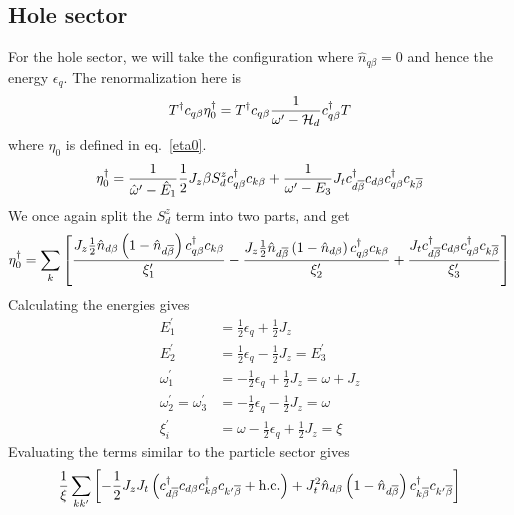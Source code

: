 \documentclass[12pt,twoside]{report}
\numberwithin{equation}{section}
\begin{document}
\subsection{Hole sector}
For the hole sector, we will take the configuration where \(\hat n_{q\beta} = 0\) and hence the energy \(\epsilon_q\). The renormalization here is
\begin{equation}\begin{aligned}
	T^\dagger c_{q\beta}\eta^\dagger_0 = T^\dagger c_{q\beta}\frac{1}{\omega^\prime - \mathcal{H}_d}c^\dagger_{q\beta} T
\end{aligned}\end{equation}
where \(\eta_0\) is defined in eq.~\ref{eta0}.
\begin{equation}\begin{aligned}
	\label{holeomega}
	\eta_0^\dagger = \frac{1}{\hat \omega^\prime - \hat E_1}\frac{1}{2}J_z \beta S_d^z c^\dagger_{q\beta}c_{k\beta} + \frac{1}{\omega^\prime - E_3}J_tc^\dagger_{d\overline\beta}c_{d\beta}c^\dagger_{q\beta}c_{k\overline\beta}
\end{aligned}\end{equation}
We once again split the \(S_d^z\) term into two parts, and get
\begin{equation}\begin{aligned}
	\eta^\dagger_0 = \sum_k \left[\frac{ J_z \frac{1}{2}\hat n_{d\beta}\left( 1 - \hat n_{d\overline\beta} \right) c^\dagger_{q\beta}c_{k\beta}}{\xi^\prime_1} - \frac{J_z \frac{1}{2}\hat n_{d\overline\beta}\left( 1 - \hat n_{d\beta} \right) c^\dagger_{q\beta}c_{k\beta}}{\xi^\prime_2} + \frac{J_t  c^\dagger_{d\overline\beta}c_{d\beta} c^\dagger_{q\beta}c_{k\overline\beta}}{\xi^\prime_3}\right] 
\end{aligned}\end{equation}
Calculating the energies gives
\begin{equation}\begin{aligned}
	E^\prime_1 &= \frac{1}{2}\epsilon_q + \frac{1}{2}J_z\\
	E^\prime_2 &= \frac{1}{2}\epsilon_q - \frac{1}{2}J_z = E^\prime_3\\
	\omega^\prime_1 &= - \frac{1}{2}\epsilon_q + \frac{1}{2}J_z = \omega + J_z\\
	\omega^\prime_2 = \omega^\prime_3 &= - \frac{1}{2}\epsilon_q - \frac{1}{2}J_z = \omega\\
	\xi_i^\prime &= \omega - \frac{1}{2}\epsilon_q + \frac{1}{2}J_z = \xi
\end{aligned}\end{equation}
Evaluating the terms similar to the particle sector gives
\begin{equation}\begin{aligned}
	\label{kondo_hole}
	\frac{1}{\xi}\sum_{kk^\prime} \left[ -\frac{1}{2} J_z J_t\left(c^\dagger_{d\overline\beta}c_{d\beta}c^\dagger_{k\beta}c_{k^\prime\overline\beta} + \text{h.c.}\right) + J_t^2 \hat n_{d\beta}\left(1 - \hat n_{d\overline\beta}\right) c^\dagger_{k\overline\beta}c_{k^\prime\overline\beta}\right]
\end{aligned}\end{equation}
\end{document}
